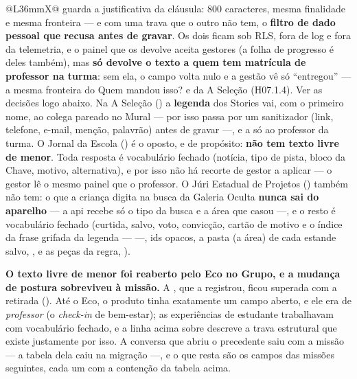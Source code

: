 \begin{tabularx}{\linewidth}{@{}L{36mm}X@{}}
   guarda a justificativa da cláusula: 800
  caracteres, mesma finalidade e mesma fronteira --- e com uma trava que o
  outro não tem, o \textbf{filtro de dado pessoal que recusa antes de
  gravar}. Os dois ficam sob RLS, fora de log e fora da telemetria, e o painel
  que os devolve aceita gestores (a folha de progresso é deles também), mas
  \textbf{só devolve o texto a quem tem matrícula de professor na turma}: sem
  ela, o campo volta nulo e a gestão vê só \enquote{entregou} --- a mesma
  fronteira do Quem mandou isso? e da A Seleção (H07.1.4). Ver as decisões
  logo abaixo. Na A Seleção () a \textbf{legenda} dos
  Stories vai, com o primeiro nome, ao colega pareado no Mural --- por isso passa
  por um sanitizador (link, telefone, e-mail, menção, palavrão) antes de
  gravar ---, e a  só ao professor da turma. O Jornal
  da Escola () é o oposto, e de propósito: \textbf{não tem texto
  livre de menor}. Toda resposta é vocabulário fechado (notícia, tipo de pista,
  bloco da Chave, motivo, alternativa), e por isso não há recorte de gestor a
  aplicar --- o gestor lê o mesmo painel que o professor. O Júri Estadual de
  Projetos () também não tem: o que a criança digita na busca da
  Galeria Oculta \textbf{nunca sai do aparelho} --- a api recebe só o tipo da
  busca e a área que casou ---, e o resto é vocabulário fechado (curtida,
  salvo, voto, convicção, cartão de motivo e o índice da frase grifada da
  legenda ---  ---, ids opacos, a pasta (a área) de cada
  estande salvo, , e as peças da regra, ).\\
\bottomrule
\end{tabularx}

\begin{decisao}
\textbf{O texto livre de menor foi reaberto pelo Eco no Grupo, e a mudança de
postura sobreviveu à missão.} A , que a registrou, ficou superada
com a retirada (). Até o Eco, o produto tinha exatamente um campo aberto, e ele era de \emph{professor} (o
\emph{check-in} de bem-estar); as experiências de estudante trabalhavam com
vocabulário fechado, e a linha acima sobre  descreve a
trava estrutural que existe justamente por isso. A conversa que abriu o
precedente saiu com a missão --- a tabela dela caiu na migração
 ---, e o que resta são os campos
das missões seguintes, cada um com a contenção da tabela acima.
\end{decisao}

